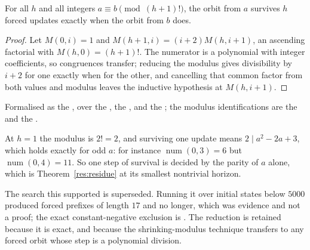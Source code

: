 \documentclass[11pt]{article}
\newcommand{\fnum}{\operatorname{num}}
\begin{document}
\begin{theorem}\label{res:residue}
For all $h$ and all integers $a\equiv b \pmod{(h+1)!}$, the orbit from $a$
survives $h$ forced updates exactly when the orbit from $b$ does.
\end{theorem}

\begin{proof}
Let $M(0,i)=1$ and $M(h+1,i)=(i+2)M(h,i+1)$, an ascending factorial with
$M(h,0)=(h+1)!$.  The numerator is a polynomial with integer coefficients, so
congruences transfer; reducing the modulus gives divisibility by $i+2$ for one
exactly when for the other, and cancelling that common factor from both values
and modulus leaves the inductive hypothesis at $M(h,i+1)$.
\end{proof}

\noindent Formalised as the
, over the
, the
, and the
; the modulus identifications are the
 and the
.

At $h=1$ the modulus is $2!=2$, and surviving one update means
$2\mid a^{2}-2a+3$, which holds exactly for odd $a$: for instance
$\fnum(0,3)=6$ but $\fnum(0,4)=11$.  So one step of survival is decided by the
parity of $a$ alone, which is Theorem~\ref{res:residue} at its smallest
nontrivial horizon.

The search this supported is superseded.  Running it over initial states below
$5000$ produced forced prefixes of length $17$ and no longer, which was
evidence and not a proof; the exact constant-negative exclusion is
.  The
reduction is retained because it is exact, and because the shrinking-modulus
technique transfers to any forced orbit whose step is a polynomial division.
\end{document}
